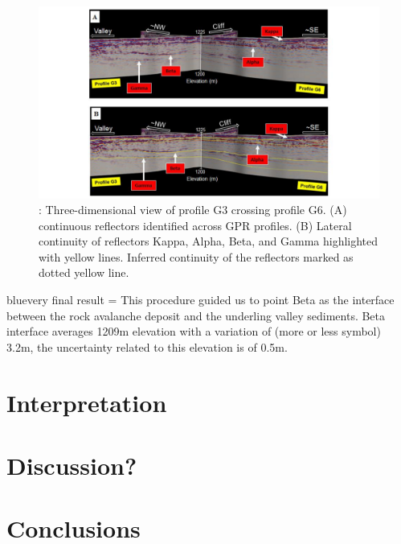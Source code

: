 \documentclass[5p]{elsarticle}
\newcommand{\COMON}{\begin{color}{blue}}
\newcommand{\COMOFF}{\end{color}}
\begin{document}
						   
								   
								   \begin{figure}[h]

	\includegraphics[width=\textwidth]{Figures/Profiles_G3_G6.pdf}
		\caption{: Three-dimensional view of profile G3 crossing profile G6. (A) continuous reflectors identified across GPR profiles. (B) Lateral continuity of reflectors Kappa, Alpha, Beta, and Gamma highlighted with yellow lines. Inferred continuity of the reflectors marked as dotted yellow line.  \label{Profiles_G3_G6}}

								   \end{figure}
	
\COMON very final result = This procedure guided us to point Beta as the interface between the rock avalanche deposit and the underling valley sediments. Beta interface averages 1209m elevation with a variation of (more or less symbol) 3.2m, the uncertainty related to this elevation is of 0.5m.\COMOFF


										
\section{Interpretation}
		
										
				
				
										
\section{Discussion?}
										
										
										
										
										
\section{Conclusions}





\end{document}
